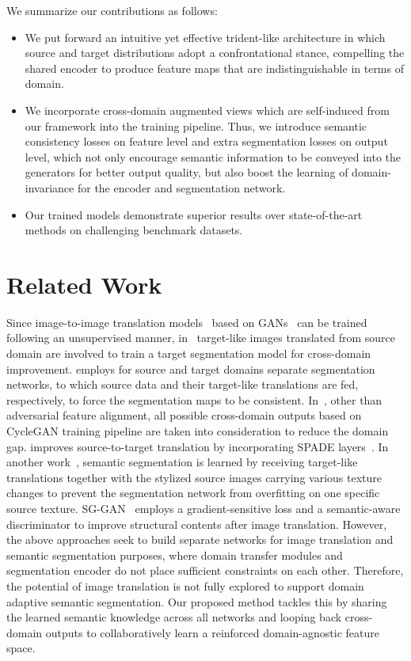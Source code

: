 \documentclass{bmvc2k}
\begin{document}
We summarize our contributions as follows:
\begin{itemize}
\item We put forward an intuitive yet effective trident-like architecture in which source and target distributions adopt a confrontational stance, compelling the shared encoder to produce feature maps that are indistinguishable in terms of domain. 
\item We incorporate cross-domain augmented views which are self-induced from our framework into the training pipeline. Thus, we introduce semantic consistency losses on feature level and extra segmentation losses on output level, which not only encourage semantic information to be conveyed into the generators for better output quality, but also boost the learning of domain-invariance for the encoder and segmentation network. 
\item Our trained models demonstrate superior results over state-of-the-art methods on challenging benchmark datasets.
\end{itemize}


\section{Related Work}
 Since image-to-image translation models~\cite{zhu2017unpaired,liu2017unsupervised,huang2018multimodal} based on GANs~\cite{goodfellow2014generative,arjovsky2017wasserstein, mao2017least,jolicoeur2018relativistic,karras2019style} can be trained following an unsupervised manner, in~\cite{hoffman2018cycada,yue2019domain} target-like images translated from source domain are involved to train a target segmentation model for cross-domain improvement. \cite{chen2019crdoco} employs for source and target domains separate segmentation networks, to which source data and their target-like translations are fed, respectively, to force the segmentation maps to be consistent. In~\cite{toldo2020unsupervised}, other than adversarial feature alignment, all possible cross-domain outputs based on CycleGAN training pipeline are taken into consideration to reduce the domain gap. \cite{musto2020semantically} improves source-to-target translation by incorporating SPADE layers~\cite{park2019semantic}. In another work~\cite{kim2020learning}, semantic segmentation is learned by receiving target-like translations together with the stylized source images carrying various texture changes to prevent the segmentation network from overfitting on one specific source texture. SG-GAN~\cite{li2018semantic} employs a gradient-sensitive loss and a semantic-aware discriminator to improve structural contents after image translation. However, the above approaches seek to build separate networks for image translation and semantic segmentation purposes, where domain transfer modules and segmentation encoder do not place sufficient constraints on each other. Therefore, the potential of image translation is not fully explored to support domain adaptive semantic segmentation. Our proposed method tackles this by sharing the learned semantic knowledge across all networks and looping back cross-domain outputs to collaboratively learn a reinforced domain-agnostic feature space. 
\end{document}
